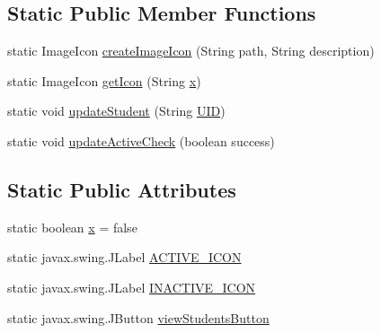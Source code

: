 \subsection*{Static Public Member Functions}
\begin{DoxyCompactItemize}
\item 
static Image\+Icon \mbox{\hyperlink{classams_1_1_user_interface_ab22216d30202f196e243447004ef51cd}{create\+Image\+Icon}} (String path, String description)
\item 
static Image\+Icon \mbox{\hyperlink{classams_1_1_user_interface_a6d65a19f7a850d64f969d516ec4b7642}{get\+Icon}} (String \mbox{\hyperlink{classams_1_1_user_interface_a5f205e78a8b1725a791e5f77a767f4f7}{x}})
\item 
static void \mbox{\hyperlink{classams_1_1_user_interface_a2c095e5b4874956fc7831b9986656130}{update\+Student}} (String \mbox{\hyperlink{classams_1_1_user_interface_a4220d2d966388244f998d042249a71fc}{U\+ID}})
\item 
static void \mbox{\hyperlink{classams_1_1_user_interface_a9350019300425cd33e6afa3155029ce6}{update\+Active\+Check}} (boolean success)
\end{DoxyCompactItemize}
\subsection*{Static Public Attributes}
\begin{DoxyCompactItemize}
\item 
static boolean \mbox{\hyperlink{classams_1_1_user_interface_a5f205e78a8b1725a791e5f77a767f4f7}{x}} = false
\item 
static javax.\+swing.\+J\+Label \mbox{\hyperlink{classams_1_1_user_interface_a0b8f1d9a42b069d55e7e686d85e9d912}{A\+C\+T\+I\+V\+E\+\_\+\+I\+C\+ON}}
\item 
static javax.\+swing.\+J\+Label \mbox{\hyperlink{classams_1_1_user_interface_a41ce6feb6a3a8e250a4a5d08543ea0e0}{I\+N\+A\+C\+T\+I\+V\+E\+\_\+\+I\+C\+ON}}
\item 
static javax.\+swing.\+J\+Button \mbox{\hyperlink{classams_1_1_user_interface_a0149f362602f1ce708e919161b3d77d2}{view\+Students\+Button}}
\end{DoxyCompactItemize}
